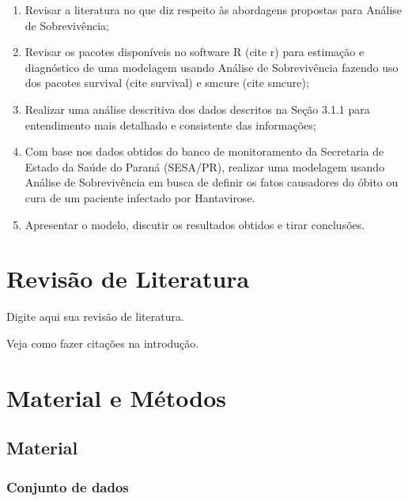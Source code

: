 \documentclass[
	12pt,				%
	openright,			%
	oneside,			%
	a4paper,			%
	brazil				%
	]{abntex2}
\begin{document}
\begin{enumerate}
\def\labelenumi{\alph{enumi}.}
\tightlist
\item
  Revisar a literatura no que diz respeito às abordagens propostas para Análise de Sobrevivência;
\item
  Revisar os pacotes disponíveis no software R (cite r) para estimação e diagnóstico de uma modelagem usando Análise de Sobrevivência fazendo uso dos pacotes survival (cite survival) e smcure (cite smcure);
\item
  Realizar uma análise descritiva dos dados descritos na Seção 3.1.1 para entendimento mais detalhado e consistente das informações;
\item
  Com base nos dados obtidos do banco de monitoramento da Secretaria de Estado da Saúde do Paraná (SESA/PR), realizar uma modelagem usando Análise de Sobrevivência em busca de definir os fatos causadores do óbito ou cura de um paciente infectado por Hantavirose.
\item
  Apresentar o modelo, discutir os resultados obtidos e tirar conclusões.
\end{enumerate}

\hypertarget{revisuxe3o-de-literatura}{%
\chapter{Revisão de Literatura}\label{revisuxe3o-de-literatura}}

\bigskip

Digite aqui sua revisão de literatura.

Veja como fazer citações na introdução.

\hypertarget{material-e-muxe9todos}{%
\chapter{Material e Métodos}\label{material-e-muxe9todos}}

\bigskip

\hypertarget{material}{%
\section{Material}\label{material}}

\hypertarget{conjunto-de-dados}{%
\subsection{Conjunto de dados}\label{conjunto-de-dados}}
\end{document}
